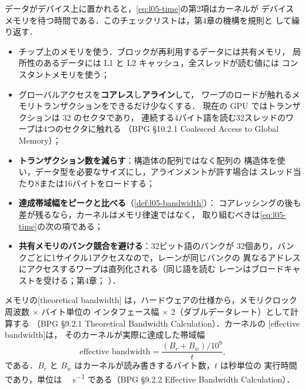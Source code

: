 \documentclass[../main.tex]{subfiles}
\begin{document}
データがデバイス上に置かれると，\cref{eq:l05-time}の第2項はカーネルが
デバイスメモリを待つ時間である．このチェックリストは，第4章の機構を規則と
して繰り返す．
\begin{itemize}
  \item チップ上のメモリを使う．ブロックが再利用するデータには共有メモリ，
    局所性のあるデータには L1 と L2 キャッシュ，全スレッドが読む値には
    コンスタントメモリを使う；
  \item グローバルアクセスを\textbf{コアレス}し\textbf{アライン}して，
    ワープのロードが触れるメモリトランザクションをできるだけ少なくする．
    現在の GPU ではトランザクションは \SI{32}{\byte} のセクタであり，
    連続する4バイト語を読む32スレッドのワープは4つのセクタに触れる
    （BPG §10.2.1 Coalesced Access to Global Memory）；
  \item \textbf{トランザクション数を減らす}：構造体の配列ではなく配列の
    構造体を使い，データ型を必要なサイズにし，アラインメントが許す場合は
    スレッド当たり8または16バイトをロードする；
  \item \textbf{達成帯域幅をピークと比べる}（\cref{def:l05-bandwidth}）：
    コアレッシングの後も差が残るなら，カーネルはメモリ律速ではなく，
    取り組むべきは\cref{eq:l05-time}の次の項である；
  \item \textbf{共有メモリのバンク競合を避ける}：32ビット語のバンクが
    32個あり，バンクごとに1サイクル1アクセスなので，レーンが同じバンクの
    異なるアドレスにアクセスするワープは直列化される（同じ語を読む
    レーンはブロードキャストを受ける；第4章；
    \cite{harris2013sharedmem}）．
\end{itemize}

\begin{definition}[理論帯域幅と実効帯域幅]
  \label{def:l05-bandwidth}
  メモリの[theoretical bandwidth]
  は，ハードウェアの仕様から，メモリクロック周波数 $\times$ バイト単位の
  インタフェース幅 $\times$ 2（ダブルデータレート）として計算する
  （BPG §9.2.1 Theoretical Bandwidth Calculation）．カーネルの
  [effective bandwidth]は，
  そのカーネルが実際に達成した帯域幅
  \begin{equation}
    \text{effective bandwidth} = \frac{(B_r + B_w)/10^9}{t},
    \label{eq:l05-effective-bw}
  \end{equation}
  である．$B_r$ と $B_w$ はカーネルが読み書きするバイト数，$t$ は秒単位の
  実行時間であり，単位は \si{\giga\byte\per\second} である（BPG §9.2.2
  Effective Bandwidth Calculation）．
\end{definition}
\end{document}

